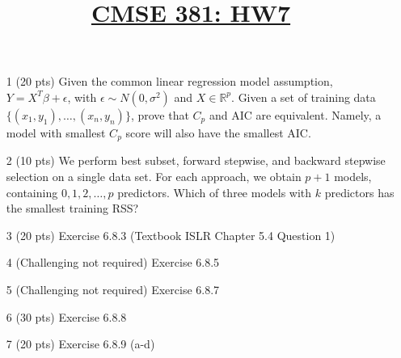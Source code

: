 \documentclass[11pt]{article}
\title{\underline{CMSE 381: HW7}}
\date{}
\newcommand{\blankline}{\quad\pagebreak[2]}
\begin{document}
\maketitle

\blankline

\begin{enumerate}
	\item[1] (20 pts) Given the common linear regression model assumption, $Y = X^T \beta + \epsilon$, with $\epsilon \sim N(0, \sigma^2)$ and $X \in \mathbb{R}^p$. Given a set of training data $\{ (x_1, y_1), \ldots, (x_n, y_n) \}$, prove that $C_p$ and AIC are equivalent. Namely, a model with smallest $C_p$ score will also have the smallest AIC. 
	\item[2] (10 pts) We perform best subset, forward stepwise, and backward stepwise selection on a single data set. For each approach, we obtain $p + 1$ models, containing $0, 1, 2, \ldots , p$ predictors. Which of three models with $k$ predictors has the smallest training RSS?
		\item[3] (20 pts) Exercise 6.8.3 	(Textbook ISLR Chapter 5.4 Question 1)

		\item[4] (Challenging not required) Exercise 6.8.5
	\item[5] (Challenging not required) Exercise 6.8.7
	\item[6] (30 pts) Exercise 6.8.8
	\item[7] (20 pts) Exercise 6.8.9 (a-d)
\end{enumerate}
\end{document}
